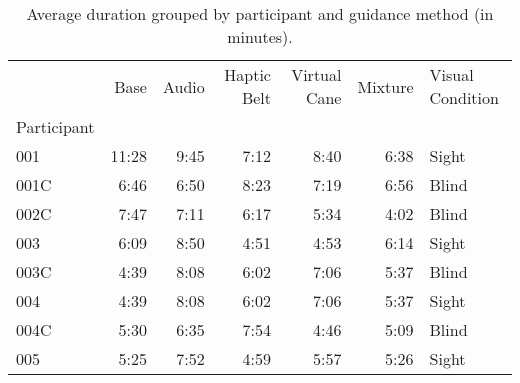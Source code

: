 
\begin{table}[!htb]
\centering
\caption{Average duration grouped by participant and guidance method (in minutes).}
\label{tab:duracao_average_scene}
\begin{tabular}{lrrrrrl}
\toprule
{} &   Base & Audio & Haptic Belt & Virtual Cane & Mixture & Visual Condition \\
Participant &        &       &             &              &         &                  \\
\midrule
001         &  11:28 &  9:45 &        7:12 &         8:40 &    6:38 &            Sight \\
001C        &   6:46 &  6:50 &        8:23 &         7:19 &    6:56 &            Blind \\
002C        &   7:47 &  7:11 &        6:17 &         5:34 &    4:02 &            Blind \\
003         &   6:09 &  8:50 &        4:51 &         4:53 &    6:14 &            Sight \\
003C        &   4:39 &  8:08 &        6:02 &         7:06 &    5:37 &            Blind \\
004         &   4:39 &  8:08 &        6:02 &         7:06 &    5:37 &            Sight \\
004C        &   5:30 &  6:35 &        7:54 &         4:46 &    5:09 &            Blind \\
005         &   5:25 &  7:52 &        4:59 &         5:57 &    5:26 &            Sight \\
\bottomrule
\end{tabular}
\end{table}

